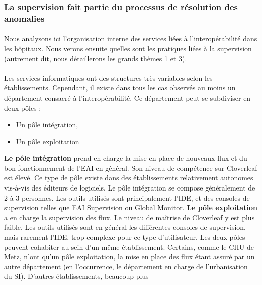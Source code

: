 		\subsubsection{La supervision fait partie du processus de résolution des
		anomalies}
			\paragraph{}%
			Nous analysons ici l'organisation interne des services liées à
			l'interopérabilité dans les hôpitaux. Nous verons ensuite quelles sont les
			pratiques liées à la supervision (autrement dit, nous détaillerons les
			grands thèmes 1 et 3).
			
			\paragraph{}%
			Les services informatiques ont des structures très variables selon les
			établissements. Cependant, il existe dans tous les cas observés au moins un
			département consacré à l’interopérabilité. Ce département peut se subdiviser
			en deux pôles :
			\begin{itemize}
			  \item Un pôle intégration,
			  \item Un pôle exploitation
			\end{itemize}
			\textbf{Le pôle intégration} prend en charge la mise en place de nouveaux
			flux et du bon fonctionnement de l’EAI en général. Son niveau de compétence sur
			Cloverleaf est élevé. Ce type de pôle existe dans des établissements
			relativement autonomes vis-à-vis des éditeurs de logiciels. Le pôle
			intégration se compose généralement de 2 à 3 personnes. Les outils utilisés
			sont principalement l’IDE, et des consoles de supervision telles que EAI
			Supervision ou Global Monitor.\newline
			\textbf{Le pôle exploitation} a en charge la supervision des flux. Le niveau
			de maîtrise de Cloverleaf y est plus faible. Les outils utilisés sont en
			général les différentes consoles de supervision,
			mais rarement l’IDE, trop complexe pour ce type d’utilisateur.\newline
			Les deux pôles peuvent cohabiter au sein d’un même établissement. Certains,
			comme le CHU de Metz, n’ont qu’un pôle exploitation, la mise en place des
			flux étant assuré par un autre département (en l’occurrence, le département
			en charge de l’urbanisation du SI). D’autres établissements, beaucoup plus
